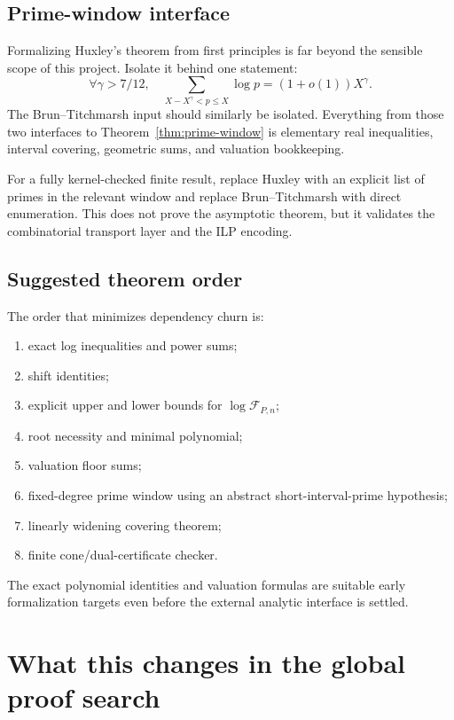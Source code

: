 \documentclass[11pt,oneside]{article}
\theoremstyle{definition}
\theoremstyle{remark}
\newcommand{\cF}{\mathcal F}
\begin{document}
\subsection{Prime-window interface}

Formalizing Huxley's theorem from first principles is far beyond the sensible scope of this
project.  Isolate it behind one statement:
\begin{equation}
 \forall\gamma>7/12,\quad
 \sum_{X-X^\gamma<p\le X}\log p=(1+o(1))X^\gamma.
 \label{eq:lean-huxley-interface}
\end{equation}
The Brun--Titchmarsh input should similarly be isolated.  Everything from those two
interfaces to Theorem~\ref{thm:prime-window} is elementary real inequalities, interval
covering, geometric sums, and valuation bookkeeping.

For a fully kernel-checked finite result, replace Huxley with an explicit list of primes in
the relevant window and replace Brun--Titchmarsh with direct enumeration.  This does not
prove the asymptotic theorem, but it validates the combinatorial transport layer and the ILP
encoding.

\subsection{Suggested theorem order}

The order that minimizes dependency churn is:
\begin{enumerate}
\item exact log inequalities and power sums;
\item shift identities;
\item explicit upper and lower bounds for $\log\cF_{P,n}$;
\item root necessity and minimal polynomial;
\item valuation floor sums;
\item fixed-degree prime window using an abstract short-interval-prime hypothesis;
\item linearly widening covering theorem;
\item finite cone/dual-certificate checker.
\end{enumerate}

The exact polynomial identities and valuation formulas are suitable early formalization
targets even before the external analytic interface is settled.

\section{What this changes in the global proof search}
\label{sec:global-assessment}
\end{document}
